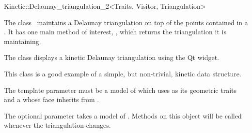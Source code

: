 

\begin{ccRefClass}{Kinetic::Delaunay_triangulation_2<Traits, Visitor, Triangulation>}  %


\ccDefinition
  
The class \ccRefName\ maintains a Delaunay triangulation on top of the
points contained in a . It has one
main method of interest, , which returns the
triangulation it is maintaining.

The class  displays a kinetic Delaunay
triangulation using the Qt widget.

This class is a good example of a simple, but non-trivial, kinetic
data structure.

The  template parameter must be a model of
 which uses
 as its geometric traits and a
 whose face inherits from
.

The optional  parameter takes a model of
. Methods on this object will be called
whenever the triangulation changes.


\ccIsModel



\ccTypes




\end{ccRefClass}
